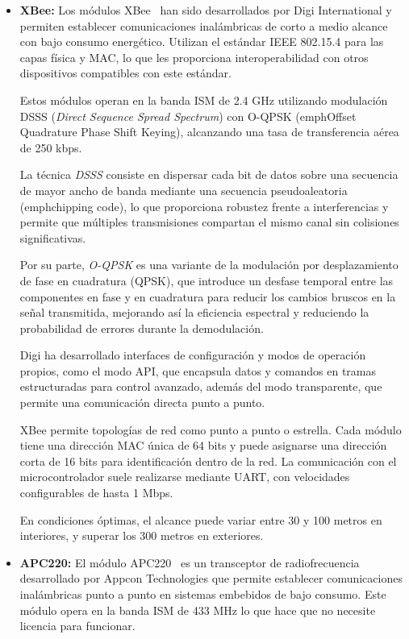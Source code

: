 \begin{itemize}
    \item \textbf{XBee:} Los módulos XBee~\cite{digi_xbee_15_4} han sido desarrollados por Digi International y permiten establecer comunicaciones inalámbricas de corto a medio alcance
    con bajo consumo energético.
    Utilizan el estándar IEEE 802.15.4 para las capas física y MAC, lo que les proporciona interoperabilidad con otros dispositivos compatibles con este estándar.

    Estos módulos operan en la banda ISM de 2.4 GHz utilizando modulación DSSS (\emph{Direct Sequence Spread Spectrum}) con O-QPSK (emph{Offset Quadrature Phase Shift Keying}), alcanzando una tasa de transferencia aérea de 250 kbps.

    La técnica \textit{DSSS} consiste en dispersar cada bit de datos sobre una secuencia de mayor ancho de banda mediante una secuencia pseudoaleatoria (emph{chipping code}), lo que proporciona robustez frente a interferencias y permite que múltiples transmisiones compartan el mismo canal sin colisiones significativas.

    Por su parte, \textit{O-QPSK} es una variante de la modulación por desplazamiento de fase en cuadratura (QPSK), que introduce un desfase temporal entre las componentes en fase y en cuadratura para reducir los cambios bruscos en la señal transmitida,
    mejorando así la eficiencia espectral y reduciendo la probabilidad de errores durante la demodulación.

    Digi ha desarrollado interfaces de configuración y modos de operación propios, como el modo API, que encapsula datos y comandos en tramas estructuradas para control avanzado,
    además del modo transparente, que permite una comunicación directa punto a punto.

    XBee permite topologías de red como punto a punto o estrella.
    Cada módulo tiene una dirección MAC única de 64 bits y puede asignarse una dirección corta de 16 bits para identificación dentro de la red.
    La comunicación con el microcontrolador suele realizarse mediante UART, con velocidades configurables de hasta 1 Mbps.

    En condiciones óptimas, el alcance puede variar entre 30 y 100 metros en interiores, y superar los 300 metros en exteriores.
    \item \textbf{APC220:} El módulo APC220~\cite{apc220_datasheet} es un transceptor de radiofrecuencia desarrollado por Appcon Technologies que permite establecer comunicaciones inalámbricas punto a punto en sistemas embebidos de bajo consumo.
    Este módulo opera en la banda ISM de 433 MHz lo que hace que no necesite licencia para funcionar.


\end{itemize}
